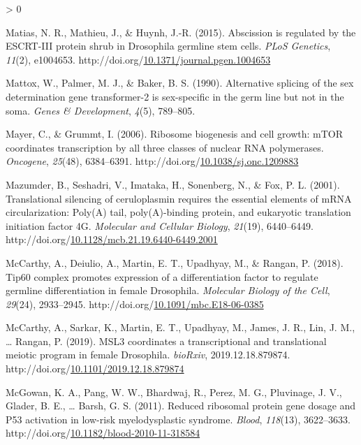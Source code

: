 \documentclass[12pt,oneside]{reedthesis}
\newlength{\cslhangindent}
\newenvironment{CSLReferences}[2] %
 {%
  \setlength{\parindent}{0pt}
  \ifodd #1 \everypar{\setlength{\hangindent}{\cslhangindent}}\ignorespaces\fi
  \ifnum #2 > 0
  \setlength{\parskip}{#2\baselineskip}
  \fi
 }%
 {}
\begin{document}
\begin{CSLReferences}{1}{0}
\leavevmode\hypertarget{ref-Matias2015g}{}%
Matias, N. R., Mathieu, J., \& Huynh, J.-R. (2015). Abscission is regulated by the {ESCRT}-{III} protein shrub in {Drosophila} germline stem cells. \emph{PLoS Genetics}, \emph{11}(2), e1004653. http://doi.org/\href{https://doi.org/10.1371/journal.pgen.1004653}{10.1371/journal.pgen.1004653}

\leavevmode\hypertarget{ref-Mattox1990}{}%
Mattox, W., Palmer, M. J., \& Baker, B. S. (1990). Alternative splicing of the sex determination gene transformer-2 is sex-specific in the germ line but not in the soma. \emph{Genes \& Development}, \emph{4}(5), 789--805.

\leavevmode\hypertarget{ref-Mayer2006a}{}%
Mayer, C., \& Grummt, I. (2006). Ribosome biogenesis and cell growth: {mTOR} coordinates transcription by all three classes of nuclear {RNA} polymerases. \emph{Oncogene}, \emph{25}(48), 6384--6391. http://doi.org/\href{https://doi.org/10.1038/sj.onc.1209883}{10.1038/sj.onc.1209883}

\leavevmode\hypertarget{ref-Mazumder2001k}{}%
Mazumder, B., Seshadri, V., Imataka, H., Sonenberg, N., \& Fox, P. L. (2001). Translational silencing of ceruloplasmin requires the essential elements of {mRNA} circularization: Poly({A}) tail, poly({A})-binding protein, and eukaryotic translation initiation factor {4G}. \emph{Molecular and Cellular Biology}, \emph{21}(19), 6440--6449. http://doi.org/\href{https://doi.org/10.1128/mcb.21.19.6440-6449.2001}{10.1128/mcb.21.19.6440-6449.2001}

\leavevmode\hypertarget{ref-McCarthy2018h}{}%
McCarthy, A., Deiulio, A., Martin, E. T., Upadhyay, M., \& Rangan, P. (2018). Tip60 complex promotes expression of a differentiation factor to regulate germline differentiation in female {Drosophila}. \emph{Molecular Biology of the Cell}, \emph{29}(24), 2933--2945. http://doi.org/\href{https://doi.org/10.1091/mbc.E18-06-0385}{10.1091/mbc.E18-06-0385}

\leavevmode\hypertarget{ref-mccarthyMSL3CoordinatesTranscriptional2019}{}%
McCarthy, A., Sarkar, K., Martin, E. T., Upadhyay, M., James, J. R., Lin, J. M., \ldots{} Rangan, P. (2019). {MSL3} coordinates a transcriptional and translational meiotic program in female {Drosophila}. \emph{bioRxiv}, 2019.12.18.879874. http://doi.org/\href{https://doi.org/10.1101/2019.12.18.879874}{10.1101/2019.12.18.879874}

\leavevmode\hypertarget{ref-mcgowanReducedRibosomalProtein2011}{}%
McGowan, K. A., Pang, W. W., Bhardwaj, R., Perez, M. G., Pluvinage, J. V., Glader, B. E., \ldots{} Barsh, G. S. (2011). Reduced ribosomal protein gene dosage and P53 activation in low-risk myelodysplastic syndrome. \emph{Blood}, \emph{118}(13), 3622--3633. http://doi.org/\href{https://doi.org/10.1182/blood-2010-11-318584}{10.1182/blood-2010-11-318584}


\end{CSLReferences}
\end{document}
